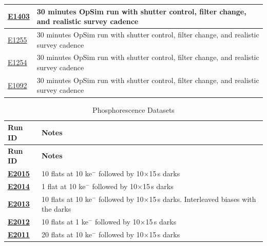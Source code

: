 \begin{longtable}{|p{5.0cm}|p{8.5cm}|}
\href{https://s3df.slac.stanford.edu/data/rubin/lsstcam/E1403/w_2024_35/}{E1403} & 30 minutes OpSim run with shutter control, filter change, and realistic survey cadence \\ \hline
\href{https://s3df.slac.stanford.edu/data/rubin/lsstcam/E1255/w_2024_35/}{E1255} & 30 minutes OpSim run with shutter control, filter change, and realistic survey cadence \\ \hline
\href{https://s3df.slac.stanford.edu/data/rubin/lsstcam/E1254/w_2024_35/}{E1254} & 30 minutes OpSim run with shutter control, filter change, and realistic survey cadence \\ \hline
\href{https://s3df.slac.stanford.edu/data/rubin/lsstcam/E1092/w_2024_35/}{E1092} & 30 minutes OpSim run with shutter control, filter change, and realistic survey cadence \\ \hline

\end{longtable}


\begin{longtable}{|p{5.0cm}|p{8.5cm}|}
\caption{Phosphorescence Datasets}\label{table:runs_phosphorescence} \\
\hline
\textbf{Run ID} & \textbf{Notes} \\ \hline
\endfirsthead
\hline
\textbf{Run ID} & \textbf{Notes} \\ \hline
\endhead
\hline
\endfoot
\hline
\endlastfoot

\textbf{\href{https://s3df.slac.stanford.edu/data/rubin/lsstcam/E2015/w_2024_35/}{E2015}} & 10 flats at 10 ke$^-$ followed by 10$\times$15\,s darks \\ \hline
\textbf{\href{https://s3df.slac.stanford.edu/data/rubin/lsstcam/E2014/w_2024_35/}{E2014}} & 1 flat at 10 ke$^-$ followed by 10$\times$15\,s darks \\ \hline
\textbf{\href{https://s3df.slac.stanford.edu/data/rubin/lsstcam/E2013/w_2024_35/}{E2013}} & 10 flats at 10 ke$^-$ followed by 10$\times$15\,s darks. Interleaved biases with the darks \\ \hline
\textbf{\href{https://s3df.slac.stanford.edu/data/rubin/lsstcam/E2012/w_2024_35/}{E2012}} & 10 flats at 1 ke$^-$ followed by 10$\times$15\,s darks \\ \hline
\textbf{\href{https://s3df.slac.stanford.edu/data/rubin/lsstcam/E2011/w_2024_35/}{E2011}} & 20 flats at 10 ke$^-$ followed by 10$\times$15\,s darks \\ \hline

\end{longtable}

